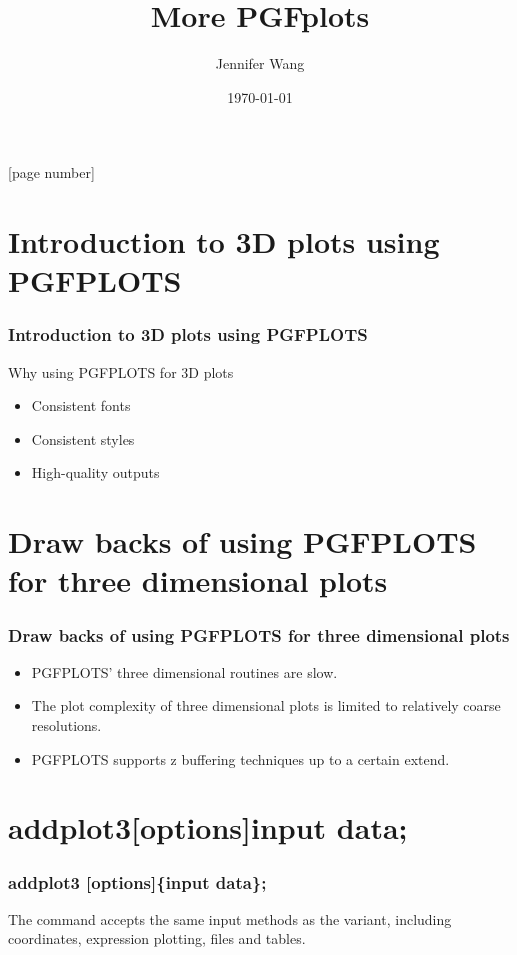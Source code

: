\documentclass{beamer}
\title{More PGFplots}
\author{Jennifer Wang}
\institute{Department of Electrical and Computer Engineerig\\
						Auburn University}
\date{\today}
\begin{document}
\maketitle
{}[page number]
\section{Introduction to 3D plots using PGFPLOTS}
\begin{frame}	
	\frametitle{Introduction to 3D plots using PGFPLOTS}
	Why using PGFPLOTS for 3D plots\\
	\begin{itemize}
	\item Consistent fonts
	\item Consistent styles
	\item High-quality outputs
	\end{itemize}
\end{frame}
\section{Draw backs of using PGFPLOTS for three dimensional plots}
\begin{frame}
	\frametitle{Draw backs of using PGFPLOTS for three dimensional plots}
  \begin{itemize}
	\item PGFPLOTS' three dimensional routines are slow.
  \item The plot complexity of three dimensional plots is limited to relatively coarse resolutions.
  \item PGFPLOTS supports z buffering techniques up to a certain extend.
  \end{itemize}
\end{frame}
\section{addplot3[options]{input data};}
\begin{frame}
	\frametitle{\color{blue}addplot3 \color{black}[options]\{input data\};}
	The \color{blue}{addplot3} \color{black}command accepts the same input methods as the \color{blue}{addplot} \color{black}variant, including coordinates, expression plotting, files and tables.
\end{frame}
\end{document}
